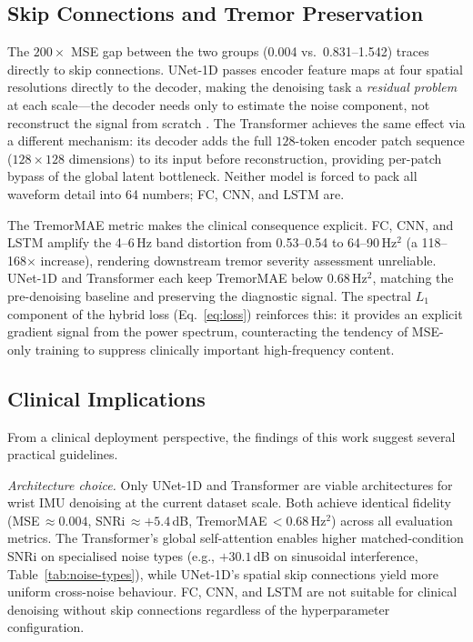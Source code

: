 \documentclass{article}
\begin{document}
\subsection{Skip Connections and Tremor Preservation}

The $200\times$ MSE gap between the two groups (0.004 vs.\ 0.831--1.542)
traces directly to skip connections.
UNet-1D passes encoder feature maps at four spatial resolutions directly to
the decoder, making the denoising task a \emph{residual problem} at each
scale---the decoder needs only to estimate the noise component, not
reconstruct the signal from scratch \citep{he2016deep}.
The Transformer achieves the same effect via a different mechanism: its
decoder adds the full $128$-token encoder patch sequence ($128\!\times\!128$
dimensions) to its input before reconstruction, providing per-patch bypass
of the global latent bottleneck.
Neither model is forced to pack all waveform detail into 64 numbers;
FC, CNN, and LSTM are.

The TremorMAE metric makes the clinical consequence explicit.
FC, CNN, and LSTM amplify the 4--6\,Hz band distortion from 0.53--0.54
to 64--90\,Hz$^2$ (a 118--168$\times$ increase), rendering downstream tremor
severity assessment unreliable.
UNet-1D and Transformer each keep TremorMAE below 0.68\,Hz$^2$, matching
the pre-denoising baseline and preserving the diagnostic signal.
The spectral $L_1$ component of the hybrid loss (Eq.~\eqref{eq:loss})
reinforces this: it provides an explicit gradient signal from the power
spectrum, counteracting the tendency of MSE-only training to suppress
clinically important high-frequency content.

\subsection{Clinical Implications}

From a clinical deployment perspective, the findings of this work suggest
several practical guidelines.

\emph{Architecture choice.}
Only UNet-1D and Transformer are viable architectures for wrist IMU denoising
at the current dataset scale.
Both achieve identical fidelity (MSE\,$\approx 0.004$, SNRi\,$\approx +5.4$\,dB,
TremorMAE\,$< 0.68$\,Hz$^2$) across all evaluation metrics.
The Transformer's global self-attention enables higher matched-condition SNRi
on specialised noise types (e.g., $+30.1$\,dB on sinusoidal interference,
Table~\ref{tab:noise-types}), while UNet-1D's spatial skip connections yield
more uniform cross-noise behaviour.
FC, CNN, and LSTM are not suitable for clinical denoising without skip
connections regardless of the hyperparameter configuration.
\end{document}
